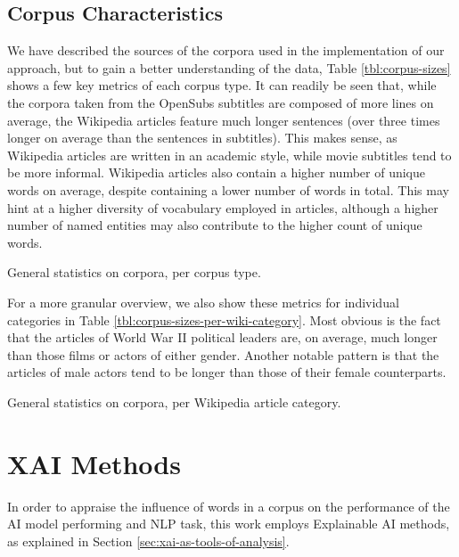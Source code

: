 \subsection{Corpus Characteristics}
We have described the sources of the corpora used in the implementation of our approach, but to gain a better understanding of the data, Table \ref{tbl:corpus-sizes} shows a few key metrics of each corpus type.
It can readily be seen that, while the corpora taken from the OpenSubs subtitles are composed of more lines on average, the Wikipedia articles feature much longer sentences (over three times longer on average than the sentences in subtitles).
This makes sense, as Wikipedia articles are written in an academic style, while movie subtitles tend to be more informal.
Wikipedia articles also contain a higher number of unique words on average, despite containing a lower number of words in total.
This may hint at a higher diversity of vocabulary employed in articles, although a higher number of named entities may also contribute to the higher count of unique words.

\begin{table}[ht]
	\centering
	
	\caption{General statistics on corpora, per corpus type.}
	\label{tbl:corpus-sizes}
\end{table}


For a more granular overview, we also show these metrics for individual categories in Table \ref{tbl:corpus-sizes-per-wiki-category}.
Most obvious is the fact that the articles of World War II political leaders are, on average, much longer than those films or actors of either gender.
Another notable pattern is that the articles of male actors tend to be longer than those of their female counterparts.


\begin{table}[ht]
	\centering
	
	\caption{General statistics on corpora, per Wikipedia article category.}
	\label{tbl:corpus-sizes-per-wiki-category}
\end{table}

\section{XAI Methods} \label{sec:xai-methods}
In order to appraise the influence of words in a corpus on the performance of the AI model performing and NLP task, this work employs Explainable AI methods, as explained in Section \ref{sec:xai-as-tools-of-analysis}.

